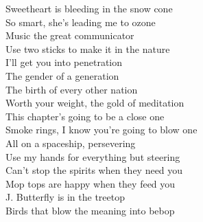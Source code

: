 Sweetheart is bleeding in the snow cone \\
So smart, she's leading me to ozone \\
Music the great communicator \\
Use two sticks to make it in the nature \\

I'll get you into penetration \\
The gender of a generation \\
The birth of every other nation \\
Worth your weight, the gold of meditation \\

This chapter's going to be a close one \\
Smoke rings, I know you're going to blow one \\
All on a spaceship, persevering \\
Use my hands for everything but steering \\

Can't stop the spirits when they need you \\
Mop tops are happy when they feed you \\
J. Butterfly is in the treetop \\
Birds that blow the meaning into bebop \\
